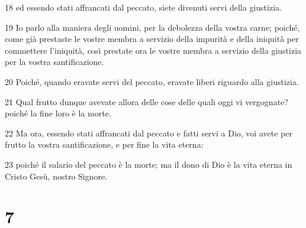 \par 18 ed essendo stati affrancati dal peccato, siete divenuti servi della giustizia.
\par 19 Io parlo alla maniera degli uomini, per la debolezza della vostra carne; poiché, come già prestaste le vostre membra a servizio della impurità e della iniquità per commettere l'iniquità, così prestate ora le vostre membra a servizio della giustizia per la vostra santificazione.
\par 20 Poiché, quando eravate servi del peccato, eravate liberi riguardo alla giustizia.
\par 21 Qual frutto dunque avevate allora delle cose delle quali oggi vi vergognate? poiché la fine loro è la morte.
\par 22 Ma ora, essendo stati affrancati dal peccato e fatti servi a Dio, voi avete per frutto la vostra santificazione, e per fine la vita eterna:
\par 23 poiché il salario del peccato è la morte; ma il dono di Dio è la vita eterna in Cristo Gesù, nostro Signore.

\chapter{7}

